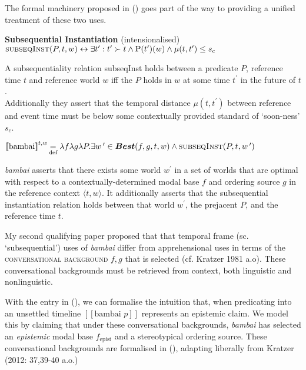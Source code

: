 \documentclass[12pt]{article}
\newcommand{\mcom}[1]
 {\marginpar{\raggedleft\raggedright\hspace{0pt}\linespread{0.9}\footnotesize{#1}}}
\newcommand{\denote}[1]{\mbox{$[\![\mbox{#1}]\!]$}}
\newcommand{\la}{\langle}
\newcommand{\ra}{\rangle}
\begin{document}
 The formal machinery proposed in (\nextx) goes part of the way to providing a unified treatment of these two uses.



\pex\a{}\textbf{Subsequential Instantiation} (intensionalised)\\$\text{{\sc subseqInst}}(P,t,w)\leftrightarrow\exists t^\prime:t^\prime\succ{}t\wedge\text P(t^\prime)(w)\wedge\mu(t,t^\prime)\leq s_c$


A subsequentiality relation {\sc subseqInst} holds between a predicate $P$, reference time $t$ and reference world $w$ iff the $P$ holds in $w$ at some time $t^\prime$ in the future of $t$.\\Additionally they assert that the temporal distance $\mu(t,t^\prime)$ between reference and event time must be below some contextually provided standard of `soon-ness' $s_c$. %


\a $\denote{bambai}^{t,w}\!\underset{\text{def}}{=}\lambda f\lambda g\lambda P.\exists w\,^\prime\in\boldsymbol{Best}(f,g,t,w)\wedge\text{{\sc subseqInst}}(P,t,w\,^\prime)$

\textit{bambai} asserts that there exists some world $w^\prime$ in a set of worlds that are optimal with respect to a contextually-determined modal base $f$ and ordering source $g$ in the reference context $\la t,w\ra$. It additionally asserts that the {\sc subsequential instantiation} relation holds between that world $w^\prime$, the prejacent $P$, and the reference time $t$.
\xe


My second qualifying paper proposed that that temporal frame (sc. `subsequential') uses of \textit{bambai} differ from apprehensional uses in terms of the \textsc{conversational background} $f,g$ that is selected (cf. Kratzer 1981 a.o). These conversational backgrounds must be retrieved from context, both linguistic and nonlinguistic.

With the entry in (\lastx), we can formalise the intuition that, when predicating into an unsettled timeline \denote{bambai $p$} represents an epistemic claim. We model this by claiming that under these conversational backgrounds, \textit{bambai} has selected an \textit{epistemic} modal base $f_{\text{epist}}$ and a stereotypical ordering source. These conversational backgrounds are formalised in (\nextx), adapting liberally from Kratzer (2012: 37,39-40 a.o.)%
\end{document}
